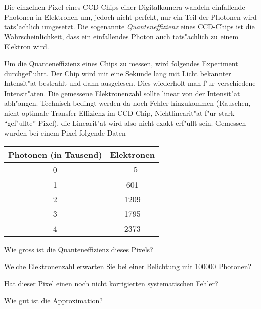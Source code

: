 Die einzelnen Pixel eines CCD-Chips einer Digitalkamera wandeln einfallende
Photonen in Elektronen um, jedoch nicht perfekt, nur ein Teil der Photonen
wird tats"achlich umgesetzt. Die sogenannte {\it Quanteneffizienz} eines
CCD-Chips ist die Wahrscheinlichkeit, dass ein einfallendes Photon
auch tats"achlich zu einem Elektron wird.

Um die Quanteneffizienz eines Chips zu messen, wird folgendes Experiment
durchgef"uhrt. Der Chip wird mit eine Sekunde lang mit Licht bekannter
Intensit"at bestrahlt und dann ausgelesen. Dies wiederholt man f"ur
verschiedene Intensit"aten. Die gemessene Elektronenzahl sollte
linear von der Intensit"at abh"angen. Technisch bedingt werden
da noch Fehler hinzukommen
(Rauschen, nicht optimale Transfer-Effizienz im CCD-Chip,
Nichtlinearit"at f"ur stark ``gef"ullte'' Pixel),
die Linearit"at wird also nicht exakt erf"ullt sein.
Gemessen wurden bei einem Pixel folgende Daten
\begin{center}
\begin{tabular}{|c|c|}
\hline
Photonen (in Tausend)&Elektronen\\
\hline
0&$-5$\\
1&601\\
2&1209\\
3&1795\\
4&2373\\
\hline
\end{tabular}
\end{center}
\begin{teilaufgaben}
\item
Wie gross ist die Quanteneffizienz dieses Pixels?
\item
Welche Elektronenzahl erwarten Sie bei einer Belichtung mit
100000 Photonen?
\item
Hat dieser Pixel einen noch nicht korrigierten systematischen Fehler?
\item
Wie gut ist die Approximation?
\end{teilaufgaben}

